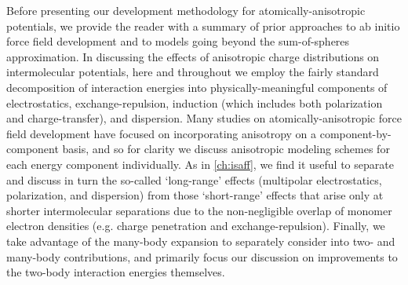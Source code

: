 Before presenting our development methodology for atomically-anisotropic
potentials, we provide the reader with a summary of prior approaches to ab
initio force field development and to models going beyond the sum-of-spheres
approximation.
In discussing the effects of anisotropic charge distributions on 
intermolecular potentials, here and throughout we employ the fairly standard\cite{Phipps2015}
decomposition of interaction energies into physically-meaningful components of electrostatics,
exchange-repulsion, induction (which includes both polarization and
charge-transfer), and dispersion. Many studies on atomically-anisotropic force
field development have focused on 
incorporating anisotropy on a component-by-component basis, and so for clarity we discuss
anisotropic modeling schemes for each energy component individually. 
As in \cref{ch:isaff},\cite{VanVleet2016} we find it useful to separate and
discuss in turn the so-called `long-range' effects (multipolar electrostatics,
polarization,
and dispersion)
from those `short-range' effects that arise only at
shorter intermolecular separations due to the non-negligible overlap of
monomer electron densities (e.g. charge penetration and exchange-repulsion).
Finally, we take advantage of the many-body
expansion\cite{Elrodt1997,Stone2007} to separately consider
into two- and many-body contributions, and primarily focus our discussion on
improvements to the two-body interaction energies themselves.



